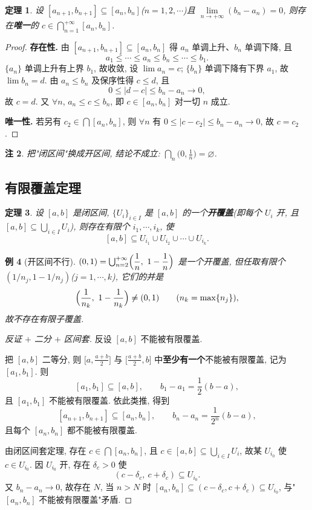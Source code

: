\documentclass[UTF8,11pt]{ctexart}
\theoremstyle{cnthm}
\newtheorem{thm}{定理}[section]
\newtheorem{rem}[thm]{注}
\newtheorem{exa}[thm]{例}
\begin{document}
\begin{thm}
设 $[a_{n+1},b_{n+1}]\subseteq[a_n,b_n]$($n=1,2,\cdots$)且 $\lim\limits_{n\to+\infty}(b_n-a_n)=0$, 则存在\textbf{唯一}的 $c\in\bigcap_{n=1}^{+\infty}[a_n,b_n]$.
\end{thm}

\begin{proof}
\textbf{存在性.} 由 $[a_{n+1},b_{n+1}]\subseteq[a_n,b_n]$ 得 $a_n$ 单调上升、$b_n$ 单调下降, 且
\[
a_1\leq\cdots\leq a_n\leq b_n\leq\cdots\leq b_1 .
\]
$\{a_n\}$ 单调上升有上界 $b_1$, 故收敛, 设 $\lim a_n=c$; $\{b_n\}$ 单调下降有下界 $a_1$, 故 $\lim b_n=d$. 由 $a_n\leq b_n$ 及保序性得 $c\leq d$, 且
\[
0\leq|d-c|\leq b_n-a_n\longrightarrow 0 ,
\]
故 $c=d$. 又 $\forall n$, $a_n\leq c\leq b_n$, 即 $c\in[a_n,b_n]$ 对一切 $n$ 成立.

\textbf{唯一性.} 若另有 $c_2\in\bigcap[a_n,b_n]$, 则 $\forall n$ 有 $0\leq|c-c_2|\leq b_n-a_n\to0$, 故 $c=c_2$.
\end{proof}

\begin{rem}
把"闭区间"换成开区间, 结论不成立: $\bigcap_{n}\bigl(0,\tfrac1n\bigr)=\varnothing$.
\end{rem}

\subsection{有限覆盖定理}

\begin{thm}
设 $[a,b]$ 是闭区间, $\{U_i\}_{i\in I}$ 是 $[a,b]$ 的一个\textbf{开覆盖}(即每个 $U_i$ 开, 且 $[a,b]\subseteq\bigcup_{i\in I}U_i$), 则存在有限个 $i_1,\cdots,i_k$, 使
\[
[a,b]\subseteq U_{i_1}\cup U_{i_2}\cup\cdots\cup U_{i_k}.
\]
\end{thm}

\begin{exa}[开区间不行]
$(0,1)=\bigcup_{n=2}^{+\infty}\Bigl(\dfrac1n,\ 1-\dfrac1n\Bigr)$ 是一个开覆盖, 但任取有限个 $(1/n_j,1-1/n_j)$($j=1,\cdots,k$), 它们的并是
\[
\Bigl(\frac{1}{n_k},\ 1-\frac{1}{n_k}\Bigr)\neq(0,1)\qquad(n_k=\max\{n_j\}),
\]
故不存在有限子覆盖.
\end{exa}

\begin{proof}[反证 $+$ 二分 $+$ 区间套]
反设 $[a,b]$ 不能被有限覆盖.

把 $[a,b]$ 二等分, 则 $\bigl[a,\frac{a+b}{2}\bigr]$ 与 $\bigl[\frac{a+b}{2},b\bigr]$ 中\textbf{至少有一个}不能被有限覆盖, 记为 $[a_1,b_1]$. 则
\[
[a_1,b_1]\subseteq[a,b],\qquad b_1-a_1=\frac12(b-a),
\]
且 $[a_1,b_1]$ 不能被有限覆盖. 依此类推, 得到
\[
[a_{n+1},b_{n+1}]\subseteq[a_n,b_n],\qquad b_n-a_n=\frac{1}{2^n}(b-a),
\]
且每个 $[a_n,b_n]$ 都不能被有限覆盖.

由闭区间套定理, 存在 $c\in\bigcap[a_n,b_n]$, 且 $c\in[a,b]\subseteq\bigcup_{i\in I}U_i$, 故某 $U_{i_0}$ 使 $c\in U_{i_0}$. 因 $U_{i_0}$ 开, 存在 $\delta_c>0$ 使
\[
(c-\delta_c,\ c+\delta_c)\subseteq U_{i_0}.
\]
又 $b_n-a_n\to0$, 故存在 $N$, 当 $n>N$ 时 $[a_n,b_n]\subseteq(c-\delta_c,c+\delta_c)\subseteq U_{i_0}$, 与"$[a_n,b_n]$ 不能被有限覆盖"矛盾.
\end{proof}
\end{document}
